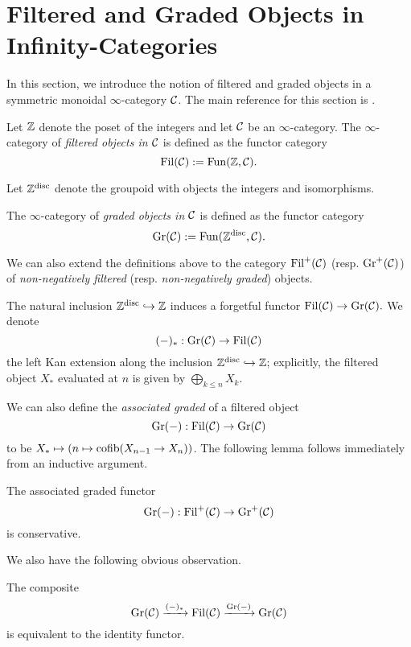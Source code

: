 \section{Filtered and Graded Objects in Infinity-Categories}
In this section, we introduce the notion of filtered and graded objects in a symmetric monoidal $\infty$-category ${\mathcal{C}}$.
The main reference for this section is \cite{Brantner-Mathew}.
\begin{definition}
	Let ${\mathbb{Z}}$ denote the poset of the integers and let ${\mathcal{C}}$ be an $\infty$-category.
	The $\infty$-category of \emph{filtered objects in ${\mathcal{C}}$} is defined as the functor category 
	$$
	\operatorname{\operatorname{Fil}}({\mathcal{C}}) :=\operatorname{Fun}({\mathbb{Z}}, {\mathcal{C}}).
	$$
\end{definition}

Let ${\mathbb{Z}}^{\operatorname{disc}}$ denote the groupoid with objects the integers and isomorphisms.
\begin{definition}
	The $\infty$-category of \emph{graded objects in ${\mathcal{C}}$} is defined as the functor category 
	$$
	\operatorname{\operatorname{Gr}}({\mathcal{C}}):=\operatorname{Fun}({\mathbb{Z}}^{\operatorname{disc}}, {\mathcal{C}}).
	$$
\end{definition}

\begin{remark}
	We can also extend the definitions above to the category $\operatorname{\operatorname{Fil}}^{+}({\mathcal{C}})$ (resp. $\operatorname{Gr}^{+}({\mathcal{C}})$) of \emph{non-negatively filtered} (resp. \emph{non-negatively graded}) objects.
\end{remark}

The natural inclusion $ {\mathbb{Z}}^{\operatorname{disc}}\hookrightarrow {\mathbb{Z}}$ induces a forgetful functor
$
\operatorname{\operatorname{Fil}}({\mathcal{C}}) \to \operatorname{Gr}({\mathcal{C}}). 
$
We denote $$
(-)_*: \operatorname{\operatorname{Gr}}({\mathcal{C}}) \to \operatorname{\operatorname{Fil}}({\mathcal{C}})
$$ the left Kan extension along the inclusion $ {\mathbb{Z}}^{\operatorname{disc}}\hookrightarrow {\mathbb{Z}}$; explicitly, the filtered object $X_*$ evaluated at $n$ is given by $\bigoplus_{k\leq n} X_k$.

We can also define the \emph{associated graded} of a filtered object 
$$
\operatorname{\operatorname{Gr}}(-):
\operatorname{\operatorname{Fil}}({\mathcal{C}})
\to 
\operatorname{\operatorname{Gr}}({\mathcal{C}})
$$
to be $X_* \mapsto (n \mapsto \operatorname{cofib}(X_{n-1} \to X_{n}))$.
The following lemma follows immediately from an inductive argument.
\begin{lemma}
\label{Ass-gr is conservative}
	The associated graded functor $$\operatorname{\operatorname{Gr}}(-):
\operatorname{\operatorname{Fil}}^{+}({\mathcal{C}})
\to 
\operatorname{Gr}^{+}({\mathcal{C}})
$$
is conservative.
\end{lemma}

We also have the following obvious observation.
\begin{lemma}
	The composite 
	\[
	\operatorname{\operatorname{Gr}}({\mathcal{C}}) \xrightarrow{(-)_*} 
	\operatorname{\operatorname{Fil}}({\mathcal{C}})
	\xrightarrow{\operatorname{\operatorname{Gr}}(-)} 
	\operatorname{\operatorname{Gr}}({\mathcal{C}}) 
	\]
	is equivalent to the identity functor.
\end{lemma}

